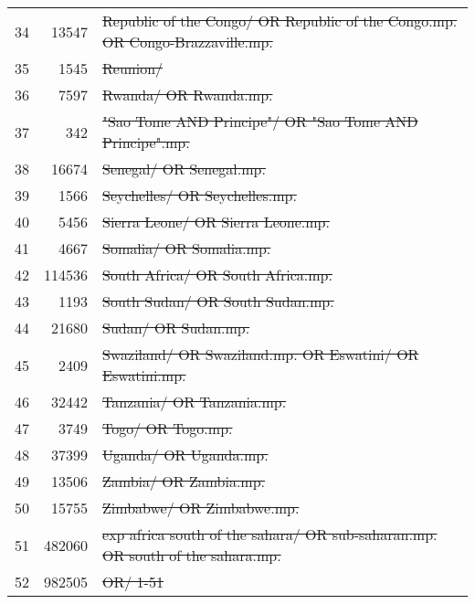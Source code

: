 \begin{tabular}{R{.02}R{.07}L{.82}}
	34 &  \num{13547} & \st{Republic of the Congo/ OR Republic of the Congo.mp. OR Congo-Brazzaville.mp.}         \\
	35 &   \num{1545} & \st{Reunion/}                                                                             \\
	36 &   \num{7597} & \st{Rwanda/ OR Rwanda.mp.}                                                                \\
	37 &    \num{342} & \st{"Sao Tome AND Principe"/ OR "Sao Tome AND Principe".mp.}                              \\
	38 &  \num{16674} & \st{Senegal/ OR Senegal.mp.}                                                              \\
	39 &   \num{1566} & \st{Seychelles/ OR Seychelles.mp.}                                                        \\
	40 &   \num{5456} & \st{Sierra Leone/ OR Sierra Leone.mp.}                                                    \\
	41 &   \num{4667} & \st{Somalia/ OR Somalia.mp.}                                                              \\
	42 & \num{114536} & \st{South Africa/ OR South Africa.mp.}                                                    \\
	43 &   \num{1193} & \st{South Sudan/ OR South Sudan.mp.}                                                      \\
	44 &  \num{21680} & \st{Sudan/ OR Sudan.mp.}                                                                  \\
	45 &   \num{2409} & \st{Swaziland/ OR Swaziland.mp. OR Eswatini/ OR Eswatini.mp.}                             \\
	46 &  \num{32442} & \st{Tanzania/ OR Tanzania.mp.}                                                            \\
	47 &   \num{3749} & \st{Togo/ OR Togo.mp.}                                                                    \\
	48 &  \num{37399} & \st{Uganda/ OR Uganda.mp.}                                                                \\
	49 &  \num{13506} & \st{Zambia/ OR Zambia.mp.}                                                                \\
	50 &  \num{15755} & \st{Zimbabwe/ OR Zimbabwe.mp.}                                                            \\
	51 & \num{482060} & \st{exp africa south of the sahara/ OR sub-saharan.mp. OR south of the sahara.mp.}        \\
	52 & \num{982505} & \st{OR/ 1-51}                                                                             \\
	\bottomrule
\end{tabular}